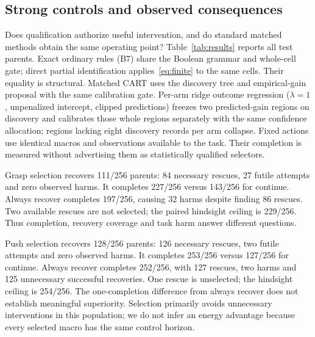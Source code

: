 \documentclass[conference]{IEEEtran}
\begin{document}
\subsection{Strong controls and observed consequences}
Does qualification authorize useful intervention, and do standard matched methods obtain the same operating point? Table~\ref{tab:results} reports all test parents. Exact ordinary rules (B7) share the Boolean grammar and whole-cell gate; direct partial identification applies~\eqref{eq:finite} to the same cells. Their equality is structural. Matched CART uses the discovery tree and empirical-gain proposal with the same calibration gate. Per-arm ridge outcome regression ($\lambda=1$, unpenalized intercept, clipped predictions) freezes two predicted-gain regions on discovery and calibrates those whole regions separately with the same confidence allocation; regions lacking eight discovery records per arm collapse. Fixed actions use identical macros and observations available to the task. Their completion is measured without advertising them as statistically qualified selectors.

\begin{table}[t]
\centering
\caption{Measured test consequences at equal learner budgets (128 discovery, 1024 calibration outcomes). R counts recoveries; Rescue, Harm and Futile count $(0,1)$, $(1,0)$ and $(0,0)$ among R. Done includes default continuation. Every macro costs 70 controls. $^\dagger$Grasp regression is retrospective. Matched methods agree on every action.}
\label{tab:results}

\end{table}

Grasp selection recovers 111/256 parents: 84 necessary rescues, 27 futile attempts and zero observed harms. It completes 227/256 versus 143/256 for continue. Always recover completes 197/256, causing 32 harms despite finding 86 rescues. Two available rescues are not selected; the paired hindsight ceiling is 229/256. Thus completion, recovery coverage and task harm answer different questions.

Push selection recovers 128/256 parents: 126 necessary rescues, two futile attempts and zero observed harms. It completes 253/256 versus 127/256 for continue. Always recover completes 252/256, with 127 rescues, two harms and 125 unnecessary successful recoveries. One rescue is unselected; the hindsight ceiling is 254/256. The one-completion difference from always recover does not establish meaningful superiority. Selection primarily avoids unnecessary interventions in this population; we do not infer an energy advantage because every selected macro has the same control horizon.
\end{document}
